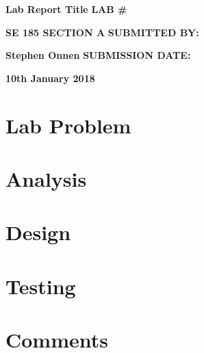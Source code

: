 \documentclass{report} %
\begin{document}
\begin{titlepage} %

\begin{center}
\vspace*{\fill}
\huge\textbf{Lab Report Title}
\vskip 0.5in
\Large\textbf{LAB \#} \par
\LARGE\textbf{SE 185 SECTION A}
\vskip 0.5in
\large\textbf{SUBMITTED BY:} \par
\LARGE\textbf{Stephen Onnen}
\vskip 0.5in
\large\textbf{SUBMISSION DATE:} \par
\LARGE\textbf{10th January 2018}
\vspace*{\fill}
\end{center}
\end{titlepage}
\begin{normalsize} %

\section*{Lab Problem} 


\vskip 0.25in
\section*{Analysis}


\vskip 0.25in
\section*{Design}


\vskip 0.25in
\section*{Testing}


\vskip 0.25in
\section*{Comments}


\end{normalsize}
\end{document}
